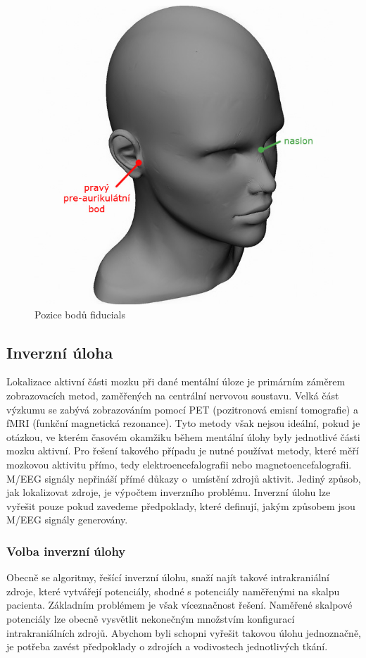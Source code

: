 \begin{figure}[!h]
\includegraphics[scale=0.32]{casti/teorie/Fiducials.jpg}
\caption{Pozice bodů fiducials}
\end{figure}

\subsection{Inverzní úloha}
Lokalizace aktivní části mozku při dané mentální úloze je primárním záměrem zobrazovacích metod, zaměřených na centrální nervovou soustavu. Velká část výzkumu se zabývá zobrazováním pomocí PET (pozitronová emisní tomografie) a fMRI (funkční magnetická rezonance)\cite{30}. Tyto metody však nejsou ideální, pokud je otázkou, ve kterém časovém okamžiku během mentální úlohy byly jednotlivé části mozku aktivní. Pro řešení takového případu je nutné používat metody, které měří mozkovou aktivitu přímo, tedy elektroencefalografii nebo magnetoencefalografii. M/EEG signály nepřináší přímé důkazy o~umístění zdrojů aktivit. Jediný způsob, jak lokalizovat zdroje, je výpočtem inverzního problému. Inverzní úlohu lze vyřešit pouze pokud zavedeme předpoklady, které definují, jakým způsobem jsou M/EEG signály generovány. \cite{29} 

\subsubsection{Volba inverzní úlohy}
Obecně se algoritmy, řešící inverzní úlohu, snaží najít takové intrakraniální zdroje, které vytvářejí potenciály, shodné s potenciály naměřenými na skalpu pacienta. Základním problémem je však víceznačnost řešení. Naměřené skalpové potenciály lze obecně vysvětlit nekonečným množstvím konfigurací intrakraniálních zdrojů. Abychom byli schopni vyřešit takovou úlohu jednoznačně, je potřeba zavést předpoklady o zdrojích a vodivostech jednotlivých tkání. \cite{40,29}

